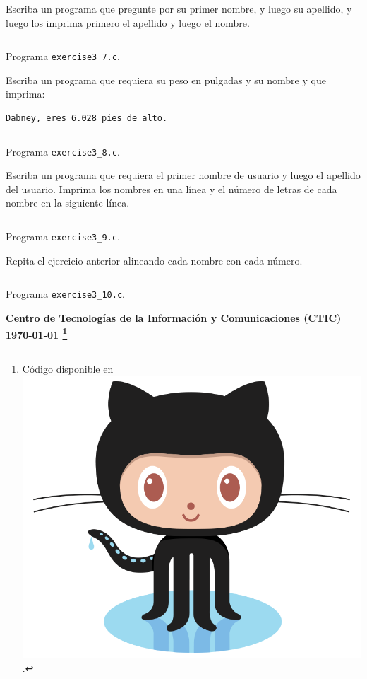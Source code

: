 \documentclass[spanish,addpoints,answers,a4paper]{exam}
\newcommand{\unmarkedfntext}[1]{%
	\begingroup
	\renewcommand\thefootnote{}\footnote{#1}%
	\addtocounter{footnote}{-1}%
	\endgroup
}
\newcommand{\mychar}{%
	\begingroup\normalfont
	\includegraphics[height=\fontcharht\font`\B]{Octocat.png}%
	\endgroup
}
\begin{document}
\begin{questions}
\begin{solution}
\begin{enumerate}[a.]
\end{enumerate}

\end{solution}

\question Escriba un programa que pregunte por su primer nombre, y luego su apellido, y luego los imprima primero el apellido y luego el nombre.

\begin{solution}
\begin{listing}[H]
	\footnotesize
	\inputminted{c}{exercise3_7.c}
	\caption{Programa \texttt{exercise3\_7.c}.}
	\label{lst:3.7}
\end{listing}
\end{solution}

\question Escriba un programa que requiera su peso en pulgadas y su nombre y que imprima:

\begin{verbatim}
Dabney, eres 6.028 pies de alto.
\end{verbatim}

\begin{solution}
\begin{listing}[H]
	\footnotesize
	\inputminted{c}{exercise3_8.c}
	\caption{Programa \texttt{exercise3\_8.c}.}
	\label{lst:3.8}
\end{listing}
\end{solution}

\question Escriba un programa que requiera el primer nombre de usuario y luego el apellido del usuario. Imprima los nombres en una línea y el número de letras de cada nombre en la siguiente línea.

\begin{solution}
\begin{listing}[H]
	\footnotesize
	\inputminted{c}{exercise3_9.c}
	\caption{Programa \texttt{exercise3\_9.c}.}
	\label{lst:3.9}
\end{listing}
\end{solution}

\question Repita el ejercicio anterior alineando cada nombre con cada número.

\begin{solution}
\begin{listing}[H]
	\footnotesize
	\inputminted{c}{exercise3_10.c}
	\caption{Programa \texttt{exercise3\_10.c}.}
	\label{lst:3.10}
\end{listing}	
\end{solution}

\end{questions}

\begin{flushright}\bfseries
Centro de Tecnologías de la Información y Comunicaciones (CTIC)\\[2mm]
\today\unmarkedfntext{Código disponible en \href{https://github.com/carlosal1015/C-Programming}{\mychar{}}.}
\end{flushright}
\end{document}
